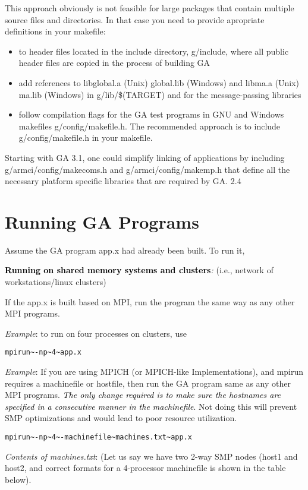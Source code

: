 This approach obviously is not feasible for large packages that contain
multiple source files and directories. In that case you need to provide
apropriate definitions in your makefile:
\begin{itemize}
\item to header files located in the include directory, g/include, where
all public header files are copied in the process of building GA 
\item add references to libglobal.a (Unix) global.lib (Windows) and libma.a
(Unix) ma.lib (Windows) in g/lib/\$(TARGET) and for the message-passing
libraries 
\item follow compilation flags for the GA test programs in GNU and Windows
makefiles g/config/makefile.h. The recommended approach is to include
g/config/makefile.h in your makefile.
\end{itemize}
Starting with GA 3.1, one could simplify linking of applications by
including g/armci/config/makecoms.h and g/armci/config/makemp.h that
define all the necessary platform specific libraries that are required
by GA. 2.4 


\section{Running GA Programs }

Assume the GA program app.x had already been built. To run it,

\textbf{\textcolor{black}{Running on shared memory systems and clusters}}\emph{:
}(i.e., network of workstations/linux clusters)

If the app.x is built based on MPI, run the program the same way as
any other MPI programs. 

\emph{Example}: to run on four processes on clusters, use 
\begin{verbatim}
mpirun~-np~4~app.x
\end{verbatim}
\emph{Example}: If you are using MPICH (or MPICH-like Implementations),
and mpirun requires a machinefile or hostfile, then run the GA program
same as any other MPI programs. \textit{\textcolor{black}{The only
change required is to make sure the hostnames are specified in a consecutive
manner in the machinefile}}. Not doing this will prevent SMP optimizations
and would lead to poor resource utilization.
\begin{verbatim}
mpirun~-np~4~-machinefile~machines.txt~app.x
\end{verbatim}
\emph{Contents of machines.txt}: (Let us say we have two 2-way SMP
nodes (host1 and host2, and correct formats for a 4-processor machinefile
is shown in the table below).

